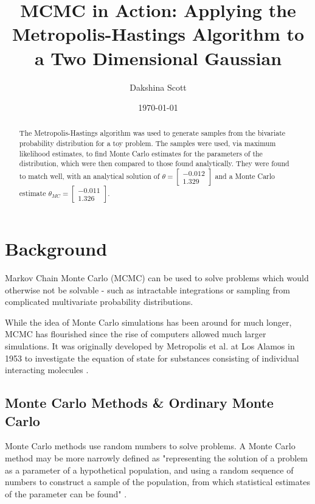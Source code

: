 \documentclass[a4paper,11pt,twoside]{article}
\begin{document}
 
\title{MCMC in Action: Applying the Metropolis-Hastings Algorithm to a Two
Dimensional Gaussian}

\date{\today} 
\author{Dakshina Scott} 
\maketitle

\begin{abstract} 
The Metropolis-Hastings algorithm was used to generate samples from the
bivariate probability distribution for a toy problem. The samples were used,
via maximum likelihood estimates, to find Monte Carlo estimates for the
parameters of the distribution, which were then compared to those found
analytically. They were found to match well, with an analytical solution of 
$\theta = \begin{bmatrix} 
		-0.012 \\ 
	1.329 \end{bmatrix}$ and a Monte Carlo estimate $\theta_{MC} = \begin{bmatrix} 
		-0.011 \\ 
	1.326 \end{bmatrix}$.  

\end{abstract}

\tableofcontents

\section{Background} 
Markov Chain Monte Carlo (MCMC) can be used to solve problems which would
otherwise not be solvable - such as intractable integrations or sampling from
complicated multivariate probability distributions.  

While the idea of Monte Carlo simulations has been
around for much longer, MCMC has flourished since the rise of computers allowed
much larger simulations. It was originally developed by Metropolis et al. at Los Alamos in
1953 to investigate the equation of state for substances consisting of
individual interacting molecules \cite{metropolis}.  

\subsection{Monte Carlo Methods \& Ordinary Monte Carlo}
Monte Carlo methods use random numbers to solve problems.  A Monte Carlo method
may be more narrowly defined as
"representing the solution of a problem as a parameter of a hypothetical
population, and using a random sequence of numbers to construct a sample of the
population, from which statistical estimates of the parameter can be found"
\cite{halton}.  
\end{document}
